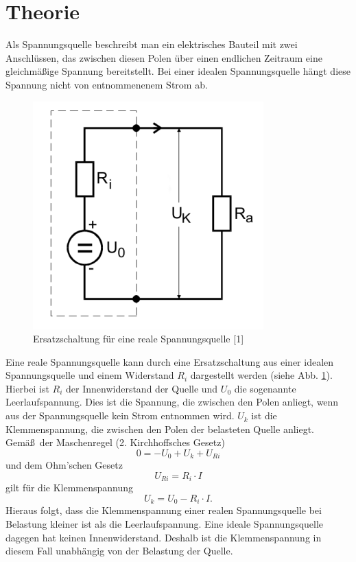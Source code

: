 \documentclass[11pt,ngerman,a4paper]{article}
\begin{document}
\section{Theorie}
Als Spannungsquelle beschreibt man ein elektrisches Bauteil mit zwei Anschl\"ussen, das zwischen diesen Polen \"uber einen endlichen Zeitraum eine gleichm\"a\ss ige Spannung bereitstellt. Bei einer idealen Spannungsquelle h\"angt diese Spannung nicht von entnommenenem Strom ab.
\begin{figure}[htp]
\centering
\includegraphics[scale=1.00]{abb3.png}
\caption{Ersatzschaltung f\"ur eine reale Spannungsquelle [1]}
\label{Ersatz}
\end{figure}
Eine reale Spannungsquelle kann  durch eine Ersatzschaltung aus einer idealen Spannungsquelle und einem Widerstand $R_i$ dargestellt werden (siehe Abb. \ref{Ersatz}). Hierbei ist $R_i$ der Innenwiderstand der Quelle und  $U_0$ die sogenannte Leerlaufspannung. Dies ist die Spannung, die zwischen den Polen anliegt, wenn aus der Spannungsquelle kein Strom entnommen wird. $U_k$ ist die Klemmenspannung, die zwischen den Polen der belasteten Quelle anliegt. Gem\"a\ss\ der Maschenregel (2. Kirchhoffsches Gesetz)
\begin{equation}
0 = -U_0 + U_k + U_{Ri}
\end{equation}
und dem Ohm'schen Gesetz
\begin{equation}
U_{Ri} = R_i \cdot I
\end{equation}
gilt f\"ur die Klemmenspannung
\begin{equation}
U_k = U_0 - R_i \cdot I.
\label{Klemmenspannung}
\end{equation}
Hieraus folgt, dass die Klemmenspannung einer realen Spannungsquelle bei Belastung kleiner ist als die Leerlaufspannung. Eine ideale Spannungsquelle dagegen hat keinen Innenwiderstand. Deshalb ist die Klemmenspannung in diesem Fall unabh\"angig von der Belastung der Quelle.
\end{document}
